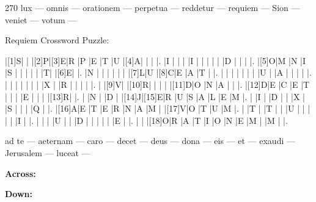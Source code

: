 \documentclass[12pt]{article}
\begin{document}
\pagestyle{fancy}
\fancyhf{}
\renewcommand{\headrulewidth}{0pt}
\renewcommand{\footrulewidth}{0pt}
\libertine
\renewcommand\PuzzleClueFont{\rm\normalsize}
\noindent\begin{rotate}{0}
\small
\end{rotate}
\hfill
\begin{rotate}{270}
\small
 lux --- omnis --- orationem --- perpetua --- reddetur --- requiem --- Sion --- veniet --- votum --- 
\end{rotate}
\begin{center}
  \huge{Requiem Crossword Puzzle:}
\end{center}
\vspace{1.5cm}
\begin{Puzzle}{15}{15}
  |[1]S|{}  |{}  |[2]P|[3]E|R   |P   |E   |T   |U   |[4]A|{}  |{}  |{}  |.
  |I   |{}  |{}  |{}  |I   |{}  |{}  |{}  |{}  |{}  |D   |{}  |{}  |{}  |.
  |[5]O|M   |N   |I   |S   |{}  |{}  |{}  |{}  |{}  |T|{}  |[6]E|{}  |.
  |N   |{}  |{}  |{}  |{}  |{}  |{}  |[7]L|U   |[8]C|E   |A   |T   |{}  |.
  |{}  |{}  |{}  |{}  |{}  |{}  |{}  |U   |{}  |A   |{}  |{}  |{}  |{}  |.
  |{}  |{}  |{}  |{}  |{}  |{}  |{}  |X   |{}  |R   |{}  |{}  |{}  |{}  |.
  |{}  |[9]V|{}  |[10]R|{}  |{}  |{}  |{}  |[11]D|O   |N   |A   |{}  |{}  |.
  |[12]D|E   |C   |E   |T   |{}  |{}  |{}  |E   |{}  |{}  |{}  |[13]R|{}  |.
  |{}  |N   |{}  |D   |{}  |[14]J|[15]E|R   |U   |S   |A   |L   |E   |M   |.
  |{}  |I   |{}  |D   |{}  |{}  |X   |{}  |S   |{}  |{}  |{}  |Q   |{}  |.
  |[16]A|E   |T   |E   |R   |N   |A   |M   |{}  |[17]V|O   |T   |U   |M   |.
  |{}  |T   |{}  |T   |{}  |{}  |U   |{}  |{}  |{}  |{}  |{}  |I   |{}  |.
  |{}  |{}  |{}  |U   |{}  |{}  |D   |{}  |{}  |{}  |{}  |{}  |E   |{}  |.
  |{}  |{}  |[18]O|R   |A   |T   |I   |O   |N   |E   |M   |{}  |M   |{}  |.
\end{Puzzle}
\begin{rotate}{90}
\small 
\qquad ad te --- aeternam --- caro --- decet --- deus --- dona --- eis --- et --- exaudi --- Jerusalem --- luceat ---
\end{rotate}
\hspace{-10pt}
\begin{PuzzleClues}{\textbf{Across:}}
\end{PuzzleClues}
\begin{PuzzleClues}{\textbf{Down:}}
\end{PuzzleClues}
\end{document}
